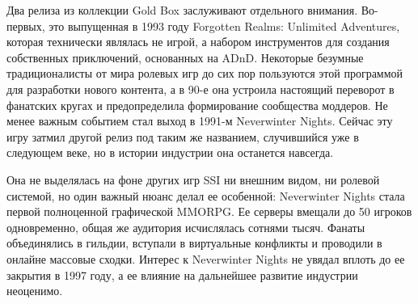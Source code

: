 Два релиза из коллекции Gold Box заслуживают отдельного внимания. Во-первых, это выпущенная в 1993 году Forgotten Realms: Unlimited Adventures, которая технически являлась не игрой, а набором инструментов для создания собственных приключений, основанных на ADnD. Некоторые безумные традиционалисты от мира ролевых игр до сих пор пользуются этой программой для разработки нового контента, а в 90-е она устроила настоящий переворот в фанатских кругах и предопределила формирование сообщества моддеров. Не менее важным событием стал выход в 1991-м Neverwinter Nights. Сейчас эту игру затмил другой релиз под таким же названием, случившийся уже в следующем веке, но в истории индустрии она останется навсегда. 

Она не выделялась на фоне других игр SSI ни внешним видом, ни ролевой системой, но один важный нюанс делал ее особенной: Neverwinter Nights стала первой полноценной графической MMORPG. Ее серверы вмещали до 50 игроков одновременно, общая же аудитория исчислялась сотнями тысяч. Фанаты объединялись в гильдии, вступали в виртуальные конфликты и проводили в онлайне массовые сходки. Интерес к Neverwinter Nights не увядал вплоть до ее закрытия в 1997 году, а ее влияние на дальнейшее развитие индустрии неоценимо. 
